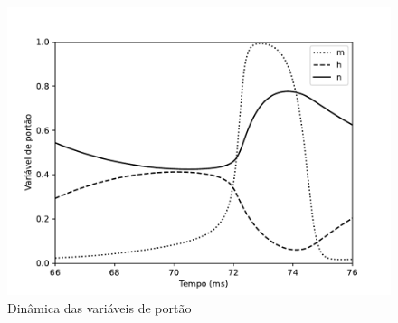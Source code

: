\begin{figure}[h!]
	\centering
	\caption{Dinâmica das variáveis de portão}
	\label{fig:portoes}
	\includegraphics[width=0.7\linewidth]{figs/portoes}
\end{figure}


